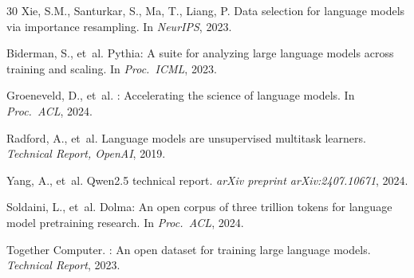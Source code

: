 \documentclass[11pt,a4paper]{article}
\begin{document}
\begin{thebibliography}{30}
Xie, S.M., Santurkar, S., Ma, T., Liang, P.
\newblock Data selection for language models via importance resampling.
\newblock In \emph{NeurIPS}, 2023.

Biderman, S., et~al.
\newblock Pythia: A suite for analyzing large language models across training and scaling.
\newblock In \emph{Proc.\ ICML}, 2023.

Groeneveld, D., et~al.
: Accelerating the science of language models.
\newblock In \emph{Proc.\ ACL}, 2024.

Radford, A., et~al.
\newblock Language models are unsupervised multitask learners.
\newblock \emph{Technical Report, OpenAI}, 2019.

Yang, A., et~al.
\newblock Qwen2.5 technical report.
\newblock \emph{arXiv preprint arXiv:2407.10671}, 2024.

Soldaini, L., et~al.
\newblock Dolma: An open corpus of three trillion tokens for language model pretraining research.
\newblock In \emph{Proc.\ ACL}, 2024.

Together Computer.
: An open dataset for training large language models.
\newblock \emph{Technical Report}, 2023.

\end{thebibliography}
\end{document}
